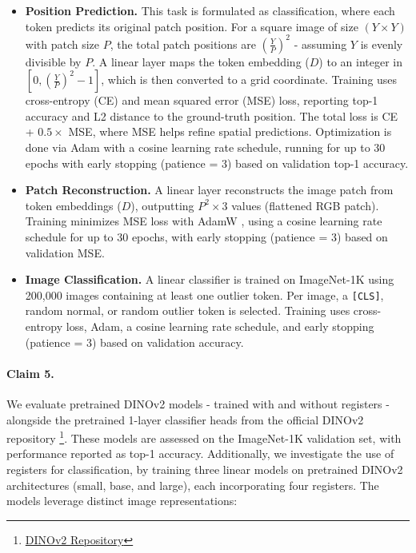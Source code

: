 \documentclass[10pt]{article} %
\begin{document}
\begin{itemize}
    \item \textbf{Position Prediction.} This task is formulated as classification, where each token predicts its original patch position. For a square image of size $(Y \times Y)$ with patch size $P$, the total patch positions are $\left(\frac{Y}{P}\right)^2$ - assuming $Y$ is evenly divisible by $P$. A linear layer maps the token embedding ($D$) to an integer in $[0, \left(\frac{Y}{P}\right)^2 - 1]$, which is then converted to a grid coordinate. Training uses cross-entropy (CE) and mean squared error (MSE) loss, reporting top-1 accuracy and L2 distance to the ground-truth position. The total loss is CE + $0.5 \times$ MSE, where MSE helps refine spatial predictions. Optimization is done via Adam \citep{kingma2017adammethodstochasticoptimization} with a cosine learning rate schedule, running for up to 30 epochs with early stopping (patience = 3) based on validation top-1 accuracy.  

    \item \textbf{Patch Reconstruction.} A linear layer reconstructs the image patch from token embeddings ($D$), outputting $P^2 \times 3$ values (flattened RGB patch). Training minimizes MSE loss with AdamW \citep{loshchilov2019decoupledweightdecayregularization}, using a cosine learning rate schedule for up to 30 epochs, with early stopping (patience = 3) based on validation MSE.

    \item \textbf{Image Classification.} A linear classifier is trained on ImageNet-1K using 200,000 images containing at least one outlier token. Per image, a \texttt{[CLS]}, random normal, or random outlier token is selected. Training uses cross-entropy loss, Adam, a cosine learning rate schedule, and early stopping (patience = 3) based on validation accuracy.
\end{itemize}

\paragraph{Claim 5.}
We evaluate pretrained DINOv2 models - trained with and without registers - alongside the pretrained 1-layer classifier heads from the official DINOv2 repository \footnote{\href{https://github.com/facebookresearch/dinov2}{DINOv2 Repository}}. These models are assessed on the ImageNet-1K validation set, with performance reported as top-1 accuracy. Additionally, we investigate the use of registers for classification, by training three linear models on pretrained DINOv2 architectures (small, base, and large), each incorporating four registers. The models leverage distinct image representations:
\end{document}
